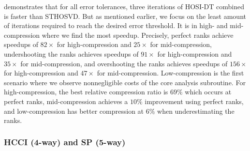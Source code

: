          demonstrates that for all error tolerances, three
        iterations of HOSI-DT combined is faster than STHOSVD. But as mentioned
        earlier, we focus on the least amount of iterations required to reach
        the desired error threshold. It is in high- and
        mid-compression where we find the most speedup. Precisely, perfect ranks
        achieve speedups of $82\times$ for high-compression and $25\times$ for
        mid-compression, undershooting the ranks achieves speedups of $91\times$
        for high-compression and $35\times$ for mid-compression, and
        overshooting the ranks achieves speedups of $156\times$ for
        high-compression and $47\times$ for mid-compression. Low-compression is
        the first scenario where we observe nonnegligible costs of the core
        analysis subroutine. 
        For
        high-compression, the best relative compression ratio is $69\%$ which
        occurs at perfect ranks, mid-compression achieves a $10\%$ improvement
        using perfect ranks, and low-compression has better compression at $6\%$
        when underestimating the ranks.

    \subsubsection{HCCI (4-way) and SP (5-way)} \label{sec:low_nr}
    
